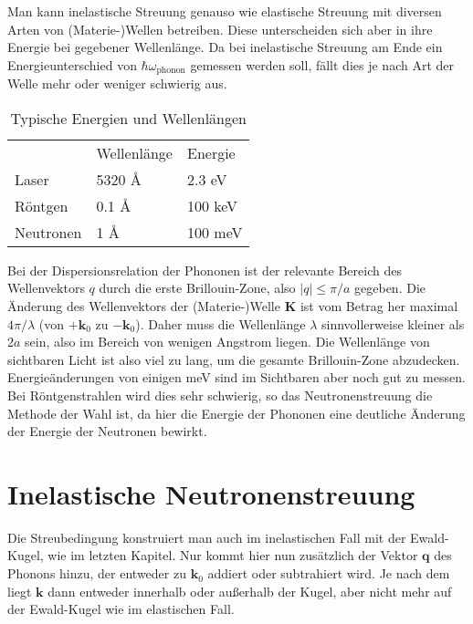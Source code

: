 Man kann inelastische Streuung genauso wie elastische Streuung mit diversen Arten von (Materie-)Wellen betreiben. Diese unterscheiden sich aber in ihre Energie bei gegebener Wellenlänge. Da bei inelastische Streuung am Ende ein Energieunterschied von $\hbar
 \omega_\text{phonon} $ gemessen werden soll, fällt dies je nach Art der Welle mehr oder weniger schwierig aus.
 
 \begin{table}
 \begin{tabular}{lll}
          & Wellenlänge & Energie \\
   Laser & 5320 \AA & 2.3 eV \\
   Röntgen & 0.1 \AA & 100 keV \\
   Neutronen & 1 \AA & 100 meV \\
 \end{tabular}
 \caption{Typische Energien und Wellenlängen}
 \end{table}

Bei der Dispersionsrelation der Phononen ist der relevante Bereich des Wellenvektors $q$ durch die erste Brillouin-Zone, also $| q | \le \pi / a$ gegeben.  Die Änderung des Wellenvektors der (Materie-)Welle $\mathbf{K}$ ist vom Betrag her maximal $4 \pi / \lambda$ (von $+\mathbf{k}_0$ zu $-\mathbf{k}_0$). Daher muss die Wellenlänge $\lambda$ sinnvollerweise kleiner als $2a$ sein, also im Bereich von wenigen Angstrom liegen.
 Die Wellenlänge von sichtbaren Licht ist also viel zu lang, um die gesamte Brillouin-Zone abzudecken. Energieänderungen  von einigen meV sind im Sichtbaren aber noch gut zu messen. Bei Röntgenstrahlen wird dies sehr schwierig, so das Neutronenstreuung die Methode der Wahl ist, da hier die Energie der Phononen eine deutliche Änderung der Energie der Neutronen bewirkt.




\section{Inelastische Neutronenstreuung}


Die Streubedingung konstruiert man auch im inelastischen Fall mit der Ewald-Kugel, wie im letzten Kapitel. Nur kommt hier nun zusätzlich der Vektor $\mathbf{q}$ des Phonons hinzu, der entweder zu $\mathbf{k}_0$ addiert oder subtrahiert wird. Je nach dem liegt $\mathbf{k}$ dann entweder innerhalb oder außerhalb der Kugel, aber nicht mehr auf der Ewald-Kugel wie im elastischen Fall.

